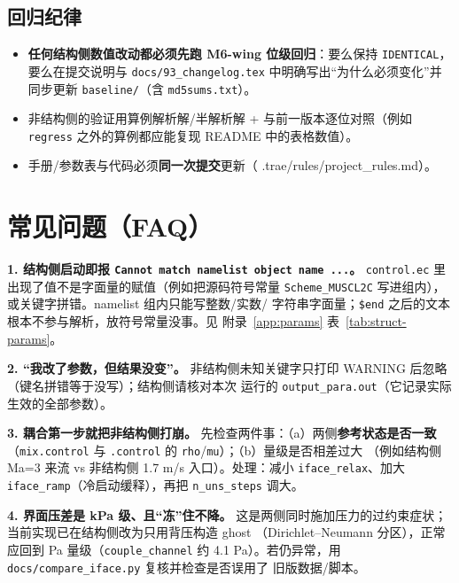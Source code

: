 \documentclass[11pt,a4paper]{ctexart}
\begin{document}
\subsection{回归纪律}

\begin{itemize}\itemsep2pt
  \item \textbf{任何结构侧数值改动都必须先跑 M6-wing 位级回归}：要么保持
        \texttt{IDENTICAL}，要么在提交说明与
        \texttt{docs/93\_changelog.tex} 中明确写出``为什么必须变化''并同步更新
        \texttt{baseline/}（含 \texttt{md5sums.txt}）。
  \item 非结构侧的验证用算例解析解/半解析解 + 与前一版本逐位对照（例如
        \texttt{regress} 之外的算例都应能复现 README 中的表格数值）。
  \item 手册/参数表与代码必须\textbf{同一次提交}更新（
        .trae/rules/project\_rules.md）。
\end{itemize}

\section{常见问题（FAQ）}\label{sec:faq}

\noindent\textbf{1. 结构侧启动即报 \texttt{Cannot match namelist object name ...}。}
\texttt{control.ec} 里出现了值不是字面量的赋值（例如把源码符号常量
\texttt{Scheme\_MUSCL2C} 写进组内），或关键字拼错。namelist 组内只能写整数/实数/
字符串字面量；\texttt{\$end} 之后的文本根本不参与解析，放符号常量没事。见
附录~\ref{app:params} 表~\ref{tab:struct-params}。

\noindent\textbf{2. ``我改了参数，但结果没变''。}
非结构侧未知关键字只打印 WARNING 后忽略（键名拼错等于没写）；结构侧请核对本次
运行的 \texttt{output\_para.out}（它记录实际生效的全部参数）。

\noindent\textbf{3. 耦合第一步就把非结构侧打崩。}
先检查两件事：（a）两侧\textbf{参考状态是否一致}（\texttt{mix.control} 与
\texttt{.control} 的 \texttt{rho}/\texttt{mu}）；（b）量级是否相差过大
（例如结构侧 Ma=3 来流 vs 非结构侧 1.7 m/s 入口）。处理：减小
\texttt{iface\_relax}、加大 \texttt{iface\_ramp}（冷启动缓释），再把
\texttt{n\_uns\_steps} 调大。

\noindent\textbf{4. 界面压差是 kPa 级、且``冻''住不降。}
这是两侧同时施加压力的过约束症状；当前实现已在结构侧改为只用背压构造 ghost
（Dirichlet--Neumann 分区），正常应回到 Pa 量级（\texttt{couple\_channel}
约 4.1 Pa）。若仍异常，用 \texttt{docs/compare\_iface.py} 复核并检查是否误用了
旧版数据/脚本。
\end{document}
